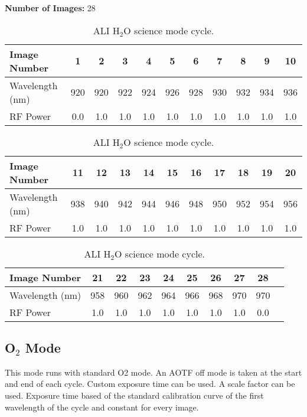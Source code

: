 \textbf{Number of Images:} 28

\begin{table}
    \begin{center}
    \begin{tabular}{|l|c|c|c|c|c|c|c|c|c|c|}
    \hline
    Image Number & 1 & 2 & 3 & 4 & 5 & 6 & 7 & 8 & 9 & 10 \\
    \hline
    Wavelength (nm) & 920 & 920 & 922 & 924 & 926 & 928 & 930 & 932 & 934 & 936 \\
    \hline
    RF Power & 0.0 & 1.0 & 1.0 & 1.0 & 1.0 & 1.0 & 1.0 & 1.0 & 1.0 & 1.0 \\
    \hline
    \end{tabular}
    \vspace{5mm}
    \begin{tabular}{|l|c|c|c|c|c|c|c|c|c|c|}
    \hline
    Image Number & 11 & 12 & 13 & 14 & 15 & 16 & 17 & 18 & 19 & 20 \\
    \hline
    Wavelength (nm) & 938 & 940 & 942 & 944 & 946 & 948 & 950 & 952 & 954 & 956 \\
    \hline
    RF Power & 1.0 & 1.0 & 1.0 & 1.0 & 1.0 & 1.0 & 1.0 & 1.0 & 1.0 & 1.0 \\
    \hline
    \end{tabular}
    \vspace{5mm}
    \begin{tabular}{|l|c|c|c|c|c|c|c|c|c|}
    \hline
    Image Number & 21 & 22 & 23 & 24 & 25 & 26 & 27 & 28 \\
    \hline
    Wavelength (nm) & 958 & 960 & 962 & 964 & 966 & 968 & 970 & 970 \\
    \hline
    RF Power & 1.0 & 1.0 & 1.0 & 1.0 & 1.0 & 1.0 & 1.0 & 0.0 \\
    \hline
    \end{tabular}
    \end{center}
    \caption[ALI H$_{2}$O Science Mode Cycle]{ALI H$_{2}$O science mode cycle.}
    \label{tab:B.2:H2OScienceModes}
\end{table}

\subsection{O$_{2}$ Mode}

This mode runs with standard O2 mode. An AOTF off mode is taken at the start and end of each cycle. Custom exposure time can be used. A scale factor can be used. Exposure time based of the standard calibration curve of the first wavelength of the cycle and constant for every image.

